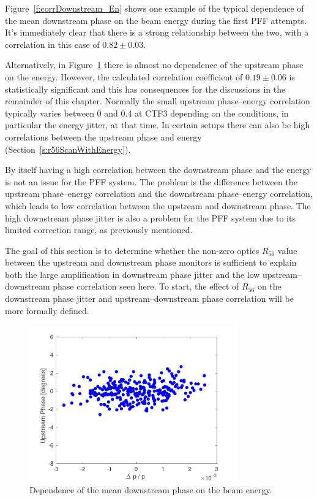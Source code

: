 Figure~\ref{f:corrDownstream_En} shows one example of the typical dependence of the mean downstream phase on the beam energy during the first PFF attempts. It's immediately clear that there is a strong relationship between the two, with a correlation in this case of \(0.82\pm0.03\). 

Alternatively, in Figure~\ref{f:corrUpstream_En} there is almost no dependence of the upstream phase on the energy. However, the calculated correlation coefficient of \(0.19\pm0.06\) is statistically significant and this has consequences for the discussions in the remainder of this chapter. Normally the small upstream phase--energy correlation typically varies between 0 and 0.4 at CTF3 depending on the conditions, in particular the energy jitter, at that time. In certain setups there can also be high correlations between the upstream phase and energy (Section~\ref{s:r56ScanWithEnergy}).

By itself having a high correlation between the downstream phase and the energy is not an issue for the PFF system. The problem is the difference between the upstream phase--energy correlation and the downstream phase--energy correlation, which leads to low correlation between the upstream and downstream phase. The high downstream phase jitter is also a problem for the PFF system due to its limited correction range, as previously mentioned.

The goal of this section is to determine whether the non-zero optics \(R_{56}\) value between the upstream and downstream phase monitors is sufficient to explain both the large amplification in downstream phase jitter and the low upstream--downstream phase correlation seen here. To start, the effect of \(R_{56}\) on the downstream phase jitter and upstream--downstream phase correlation will be more formally defined.

\begin{figure}
  \centering
  \includegraphics[width=0.8\textwidth]{Figures/propagation/corrUpstreamEn}
  \caption{Dependence of the mean downstream phase on the beam energy.}
  \label{f:corrUpstream_En}
\end{figure}

